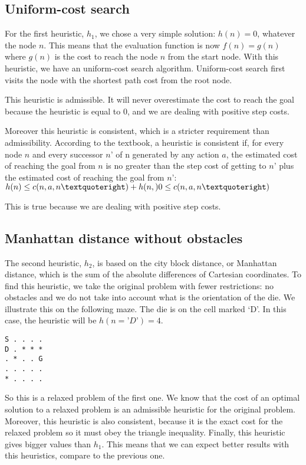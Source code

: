\documentclass[]{article}
\begin{document}
\subsection{Uniform-cost search}
For the first heuristic, $h_1$, we chose a very simple solution: $h(n) = 0$, whatever the node $n$.
This means that the evaluation function is now $f(n) = g(n)$ where $g(n)$ is the cost to reach the node $n$ from the start node.
With this heuristic, we have an uniform-cost search algorithm.
Uniform-cost search first visits the node with the shortest path cost from the root node.

This heuristic is admissible.
It will never overestimate the cost to reach the goal because the heuristic is equal to 0, and we are dealing with positive step costs.

Moreover this heuristic is consistent, which is a stricter requirement than admissibility.
According to the textbook, a heuristic is consistent if, for every node $n$ and every successor $n’$ of n generated by any action $a$, the estimated cost of reaching the goal from $n$ is no greater than the step cost of getting to $n’$ plus the estimated cost of reaching the goal from $n’$:
$\\
h(n) \leq c(n,a,n’) + h(n,) \\
0 \leq c(n,a,n’)
$

This is true because we are dealing with positive step costs.

\subsection{Manhattan distance without obstacles}
The second heuristic, $h_2$, is based on the city block distance, or Manhattan distance, which is the sum of the absolute differences of Cartesian coordinates.
To find this heuristic, we take the original problem with fewer restrictions: no obstacles and we do not take into account what is the orientation of the die. 
We illustrate this on the following maze.
The die is on the cell marked ‘D’.
In this case, the heuristic will be $h(n=’D’) = 4$.

\begin{lstlisting}
S . . . .
D . * * *
. * . . G
. . . . .
* . . . .
\end{lstlisting}

So this is a relaxed problem of the first one.
We know that the cost of an optimal solution to a relaxed problem is an admissible heuristic for the original problem.
Moreover, this heuristic is also consistent, because it is the exact cost for the relaxed problem so it must obey the triangle inequality.
Finally, this heuristic gives bigger values than $h_1$. This means that we can expect better results with this heuristics, compare to the previous one. 
\end{document}
